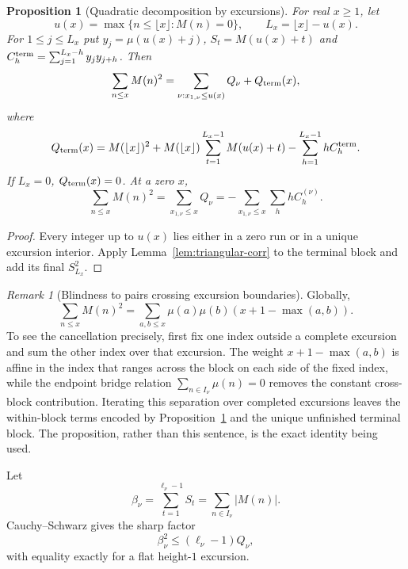 \documentclass[11pt]{amsart}
\numberwithin{equation}{section}
\theoremstyle{plain}
\newtheorem{proposition}[theorem]{Proposition}
\theoremstyle{definition}
\theoremstyle{remark}
\newtheorem{remark}[theorem]{Remark}
\begin{document}
\begin{proposition}[Quadratic decomposition by excursions]
\label{prop:quadratic-decomp}
For real $x\ge1$, let
\[
u(x)=\max\{n\le\lfloor x\rfloor:M(n)=0\},\qquad
L_x=\lfloor x\rfloor-u(x).
\]
For $1\le j\le L_x$ put $y_j=\mu(u(x)+j)$,
$S_t=M(u(x)+t)$ and
$C_h^{\rm term}=\sum_{j=1}^{L_x-h}y_jy_{j+h}$. Then
\begin{equation}
\label{eq:quadratic-decomp-general}
\sum_{n\le x}M(n)^2
=\sum_{\nu:x_{1,\nu}\le u(x)}Q_\nu+Q_{\rm term}(x),
\end{equation}
where
\begin{equation}
\label{eq:terminal-Q-exact}
Q_{\rm term}(x)=M(\lfloor x\rfloor)^2
+M(\lfloor x\rfloor)\sum_{t=1}^{L_x-1}M(u(x)+t)
-\sum_{h=1}^{L_x-1}hC_h^{\rm term}.
\end{equation}
If $L_x=0$, $Q_{\rm term}(x)=0$.  At a zero $x$,
\begin{equation}
\label{eq:quadratic-decomp-zero}
\sum_{n\le x}M(n)^2
=\sum_{x_{1,\nu}\le x}Q_\nu
=-\sum_{x_{1,\nu}\le x}\sum_hhC_h^{(\nu)}.
\end{equation}
\end{proposition}

\begin{proof}
Every integer up to $u(x)$ lies either in a zero run or in a unique excursion
interior.  Apply Lemma~\ref{lem:triangular-corr} to the terminal block and
add its final $S_{L_x}^2$.
\end{proof}

\begin{remark}[Blindness to pairs crossing excursion boundaries]
\label{rem:blindness-quadratic}
Globally,
\[
\sum_{n\le x}M(n)^2
=\sum_{a,b\le x}\mu(a)\mu(b)(x+1-\max(a,b)).
\]
To see the cancellation precisely, first fix one index outside a complete
excursion and sum the other index over that excursion.  The weight
$x+1-\max(a,b)$ is affine in the index that ranges across the block on each
side of the fixed index, while the endpoint bridge relation
$\sum_{n\in I_\nu}\mu(n)=0$ removes the constant cross-block contribution.
Iterating this separation over completed excursions leaves the within-block
terms encoded by Proposition~\ref{prop:quadratic-decomp} and the unique
unfinished terminal block.  The proposition, rather than this sentence,
is the exact identity being used.
\end{remark}

Let
\begin{equation}
\label{eq:beta_def}
\beta_\nu=\sum_{t=1}^{\ell_\nu-1}S_t
=\sum_{n\in I_\nu}|M(n)|.
\end{equation}
Cauchy--Schwarz gives the sharp factor
\begin{equation}
\label{eq:beta-Q}
\beta_\nu^2\le(\ell_\nu-1)Q_\nu,
\end{equation}
with equality exactly for a flat height-$1$ excursion.
\end{document}
